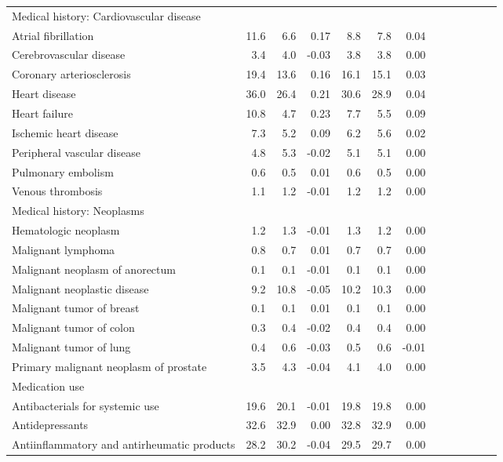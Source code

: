 \documentclass[11pt,]{article}
\begin{document}
\begin{longtable}{lrrrrrrrrrrrr}
  Medical history: Cardiovascular disease &    &    &     &    &    &     \\ 
      Atrial fibrillation & 11.6 &  6.6 &  0.17 &  8.8 &  7.8 &  0.04 \\ 
      Cerebrovascular disease &  3.4 &  4.0 & -0.03 &  3.8 &  3.8 &  0.00 \\ 
      Coronary arteriosclerosis & 19.4 & 13.6 &  0.16 & 16.1 & 15.1 &  0.03 \\ 
      Heart disease & 36.0 & 26.4 &  0.21 & 30.6 & 28.9 &  0.04 \\ 
      Heart failure & 10.8 &  4.7 &  0.23 &  7.7 &  5.5 &  0.09 \\ 
      Ischemic heart disease &  7.3 &  5.2 &  0.09 &  6.2 &  5.6 &  0.02 \\ 
      Peripheral vascular disease &  4.8 &  5.3 & -0.02 &  5.1 &  5.1 &  0.00 \\ 
      Pulmonary embolism &  0.6 &  0.5 &  0.01 &  0.6 &  0.5 &  0.00 \\ 
      Venous thrombosis &  1.1 &  1.2 & -0.01 &  1.2 &  1.2 &  0.00 \\ 
  Medical history: Neoplasms &    &    &     &    &    &     \\ 
      Hematologic neoplasm &  1.2 &  1.3 & -0.01 &  1.3 &  1.2 &  0.00 \\ 
      Malignant lymphoma &  0.8 &  0.7 &  0.01 &  0.7 &  0.7 &  0.00 \\ 
      Malignant neoplasm of anorectum &  0.1 &  0.1 & -0.01 &  0.1 &  0.1 &  0.00 \\ 
      Malignant neoplastic disease &  9.2 & 10.8 & -0.05 & 10.2 & 10.3 &  0.00 \\ 
      Malignant tumor of breast &  0.1 &  0.1 &  0.01 &  0.1 &  0.1 &  0.00 \\ 
      Malignant tumor of colon &  0.3 &  0.4 & -0.02 &  0.4 &  0.4 &  0.00 \\ 
      Malignant tumor of lung &  0.4 &  0.6 & -0.03 &  0.5 &  0.6 & -0.01 \\ 
      Primary malignant neoplasm of prostate &  3.5 &  4.3 & -0.04 &  4.1 &  4.0 &  0.00 \\ 
  Medication use &    &    &     &    &    &     \\ 
      Antibacterials for systemic use & 19.6 & 20.1 & -0.01 & 19.8 & 19.8 &  0.00 \\ 
      Antidepressants & 32.6 & 32.9 &  0.00 & 32.8 & 32.9 &  0.00 \\ 
      Antiinflammatory and antirheumatic products & 28.2 & 30.2 & -0.04 & 29.5 & 29.7 &  0.00 \\ 

\end{longtable}
\end{document}
